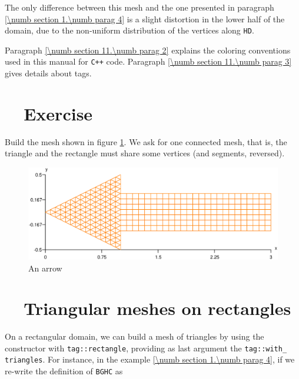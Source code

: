 The only difference between this mesh and the one presented in paragraph
\ref{\numb section 1.\numb parag 4} is a slight distortion in the lower half of the domain,
due to the non-uniform distribution of the vertices along {\small\tt HD}.

Paragraph \ref{\numb section 11.\numb parag 2} explains the coloring conventions used in
this manual for {\tt C++} code.
Paragraph \ref{\numb section 11.\numb parag 3} gives details about \textcolor{tag}{tag}s.


\section{~~Exercise}\label{\numb section 2.\numb parag 2}

Build the mesh shown in figure \ref{\numb section 2.\numb fig 2}.
We ask for one connected mesh, that is, the triangle and the rectangle must share some vertices
(and segments, reversed).

\begin{figure}[ht] \centering
  \includegraphics[width=130mm]{arrow}
  \caption{An arrow}
  \label{\numb section 2.\numb fig 2}
\end{figure}


\section{~~Triangular meshes on rectangles}\label{\numb section 2.\numb parag 3}

On a rectangular domain, we can build a mesh of triangles by using the {\small\tt{}}
constructor with {\small\tt\textcolor{tag}{tag}::rectangle}, providing as last argument the
{\small\tt\textcolor{tag}{tag}::with\_\,triangles}.
For instance, in the example \ref{\numb section 1.\numb parag 4},
if we re-write the definition of {\small\tt BGHC} as

